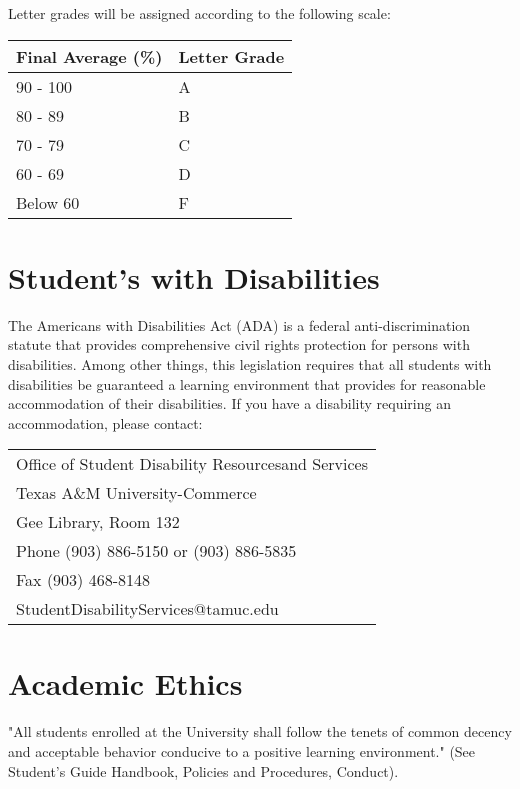 \documentclass[11pt]{article}
\begin{document}
Letter grades will be assigned according to the following scale:

\begin{center}
\begin{tabular}{ll}
Final Average (\%) & Letter Grade\\
\hline
90 - 100 & A\\
80 - 89 & B\\
70 - 79 & C\\
60 - 69 & D\\
Below 60 & F\\
\end{tabular}
\end{center}

\section*{Student's with Disabilities}
\label{sec-7}

The Americans with Disabilities Act (ADA) is a federal
anti-discrimination statute that provides comprehensive civil rights
protection for persons with disabilities.  Among other things, this
legislation requires that all students with disabilities be guaranteed
a learning environment that provides for reasonable accommodation of
their disabilities.  If you have a disability requiring an
accommodation, please contact: 

\begin{center}
\begin{tabular}{l}
Office of Student Disability Resourcesand Services\\
Texas A\&M University-Commerce\\
Gee Library, Room 132\\
Phone (903) 886-5150 or (903) 886-5835\\
Fax (903) 468-8148\\
StudentDisabilityServices@tamuc.edu\\
\end{tabular}
\end{center}

\section*{Academic Ethics}
\label{sec-8}

"All students enrolled at the University shall follow the tenets of
common decency and acceptable behavior conducive to a positive
learning environment." (See Student's Guide Handbook, Policies and
Procedures, Conduct). 
\end{document}
